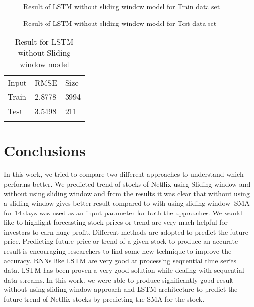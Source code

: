 \documentclass[5p,,preprint,12pt,twocolumn]{elsarticle}
\makeatletter
\def\tblbottomrule{\noalign{\vspace*{6pt}}\hline\noalign{\vspace*{2pt}}}
\def\tblmidrule{\noalign{\vspace*{6pt}}\hline\noalign{\vspace*{2pt}}}
\def\fixFloatSize#1{}%
\makeatother
\begin{document}
\bgroup
\fixFloatSize{images/2c07782a-1b01-4380-96a9-5610ce11cd14-u95-5-ma14-nflx-40-e-train-withou-sliding-window.png}
\begin{figure}[!htbp]
\centering \makeatletter{}
\makeatother 
\caption{{Result of LSTM without sliding window model for Train data set}}
\label{f-c277cf52a6fb}
\end{figure}
\egroup

\bgroup
\fixFloatSize{images/aca87a5a-3f19-4cf7-9668-18f938b4bedf-u95-5-ma14-nflx-40-e-test-withou-sliding-window.png}
\begin{figure}[!htbp]
\centering \makeatletter{}
\makeatother 
\caption{{Result of LSTM without sliding window model for Test data set}}
\label{f-396ecc875a55}
\end{figure}
\egroup

\begin{table}[!htbp]
\caption{{Result for LSTM without Sliding window model} }
\label{tw-03cba5150d1b}
\def\arraystretch{1}
\ignorespaces 
\centering 
\begin{tabulary}{\linewidth}{LLL}
\hline 
Input & RMSE & Size\\
\tblmidrule 
Train &
  2.8778 &
  3994\\
Test &
  3.5498 &
  211\\
\tblbottomrule 
\end{tabulary}\par 
\end{table}

    
\section{Conclusions}
In this work, we tried to compare two different approaches to understand which performs better. We predicted trend of stocks of Netflix using Sliding window and without using sliding window and from the results it was clear that without using a sliding window gives better result compared to with using sliding window. SMA for 14 days was used as an input parameter for both the approaches. We would like to highlight forecasting stock prices or trend are very much helpful for investors to earn huge profit. Different methods are adopted to predict the future price. Predicting future price or trend of a given stock to produce an accurate result is encouraging researchers to find some new technique to improve the accuracy. RNNs like LSTM are very good at processing sequential time series data. LSTM has been proven a very good solution while dealing with sequential data streams. In this work, we were able to produce significantly good result without using sliding window approach and LSTM architecture to predict the future trend of Netflix stocks by predicting the SMA for the stock. 






\end{document}
